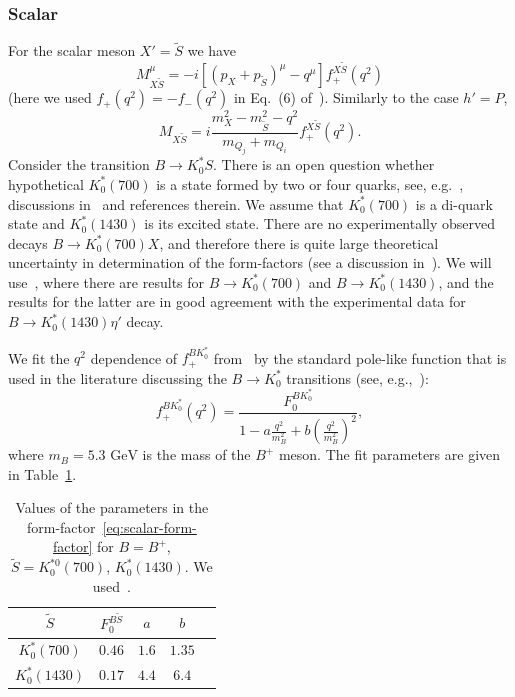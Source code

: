 \documentclass[a4paper,12pt,dvipsnames,usernames]{article}
\begin{document}
\subsubsection{Scalar}
\label{app:scalar}
For the scalar meson $X' = \tilde{S}$ we have~\cite{Sun:2010nv}
\begin{equation}
    M^{\mu}_{X\tilde{S}} = -i\left[(p_{X}+p_{\tilde{S}})^{\mu} -q^{\mu}\right]f^{X\tilde{S}}_{+}(q^{2})
\end{equation}
(here we used $f_{+}(q^{2}) = -f_{-}(q^{2})$ in Eq.~(6) of~\cite{Sun:2010nv}). Similarly to the case $h' = P$,
\begin{equation}
    M_{X\tilde{S}} =  i\frac{m_{X}^{2} - m_{\tilde{S}}^{2} - q^2}{m_{Q_{j}} + m_{Q_{i}}}f^{X\tilde{S}}_{+}(q^{2}).
\end{equation}
Consider the transition $B\to K_{0}^{*}S$. There is an open question whether hypothetical $K_{0}^{*}(700)$ is a state formed by two or four quarks, see, e.g.~\cite{Daldrop:2012sr},  discussions in~\cite{Sun:2010nv,Cheng:2013fba} and references therein. We assume that $K_{0}^{*}(700)$ is a di-quark state and $K_{0}^{*}(1430)$ is its excited state. There are no experimentally observed decays $B \to K_{0}^{*}(700)X$, and therefore there is quite large theoretical uncertainty in determination of the form-factors (see a discussion in~\cite{Issadykov:2015iba}). We will use~\cite{Sun:2010nv}, where there are results for $B\to K_{0}^{*}(700)$ and $B\to K_{0}^{*}(1430)$, and the results for the latter are in good agreement with the experimental data for $B \to K_{0}^{*}(1430)\eta'$ decay. 

We fit the $q^{2}$ dependence of $f^{BK_{0}^{*}}_{+}$ from~\cite{Sun:2010nv} by the standard pole-like function that is used in the literature discussing the $B \to K^{*}_{0}$ transitions (see, e.g.,~\cite{Cheng:2013fba}):
\begin{equation}
    f^{BK_{0}^{*}}_{+}(q^{2}) = \frac{F^{BK_{0}^{*}}_{0}}{1-a\frac{q^{2}}{m_{B}^{2}}+b\left(\frac{q^{2}}{m_{B}^{2}}\right)^{2}},
    \label{eq:scalar-form-factor}
\end{equation}
where $m_{B} = 5.3\text{ GeV}$ is the mass of the $B^{+}$ meson.
The fit parameters are given in Table~\ref{tab:scalar-form-factor-parameters}.
\begin{table}[t!]
    \centering
    \begin{tabular}{|c|c|c|c|c|}
        \hline  
        $\tilde{S}$ &$F_{0}^{B\tilde{S}}$ &    $a$ & $b$   \\
        \hline
         $K_{0}^{*}(700)$ & $0.46$ & $1.6$ & $1.35$ \\
        \hline
        $K_{0}^{*}(1430)$ & $0.17$  & $4.4$  & $6.4$ \\
        \hline
    \end{tabular}
    \caption{Values of the parameters in the form-factor~\eqref{eq:scalar-form-factor} for $B = B^{+}$, $\tilde{S} = K_{0}^{*0}(700)$, $K_{0}^{*}(1430)$. We used~\cite{Sun:2010nv}.}
    \label{tab:scalar-form-factor-parameters}
\end{table}
\end{document}
